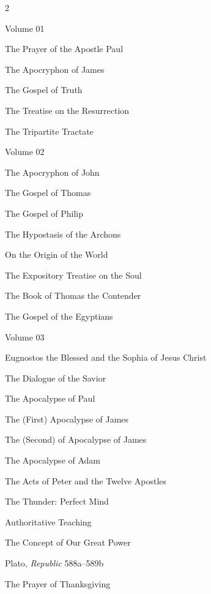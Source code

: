 \begin{multicols}{2}
				\begin{compactitem}
					\item Volume 01
						\begin{compactitem}
							\item The Prayer of the Apostle Paul
							\item The Apocryphon of James
							\item The Gospel of Truth
							\item The Treatise on the Resurrection
							\item The Tripartite Tractate
						\end{compactitem}
					\item Volume 02
						\begin{compactitem}
							\item The Apocryphon of John
							\item The Gospel of Thomas
							\item The Gospel of Philip
							\item The Hypostasis of the Archons
							\item On the Origin of the World
							\item The Expository Treatise on the Soul
							\item The Book of Thomas the Contender
							\item The Gospel of the Egyptians
						\end{compactitem}
					\item Volume 03
						\begin{compactitem}
							\item Eugnostos the Blessed and the Sophia of Jesus Christ
							\item The Dialogue of the Savior
							\item The Apocalypse of Paul
							\item The (First) Apocalypse of James
							\item The (Second) of Apocalypse of James
							\item The Apocalypse of Adam
							\item The Acts of Peter and the Twelve Apostles
							\item The Thunder: Perfect Mind
							\item Authoritative Teaching
							\item The Concept of Our Great Power
							\item Plato, \textit{Republic} 588a--589b
							\item The Prayer of Thanksgiving

\end{compactitem}
\end{compactitem}
\end{multicols}
